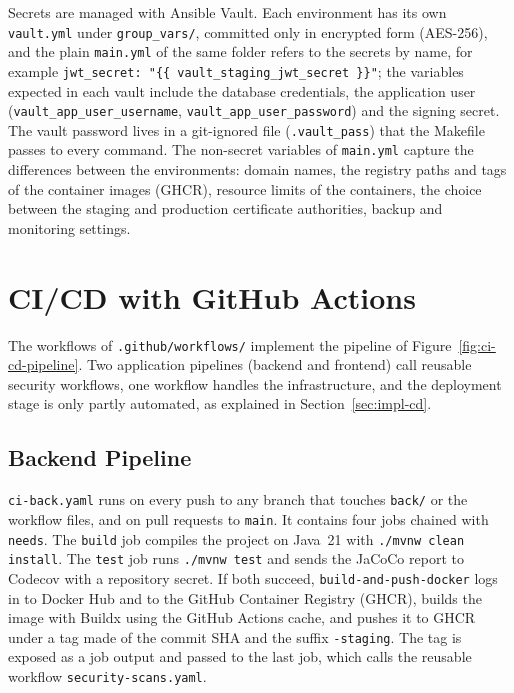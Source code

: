 Secrets are managed with Ansible Vault. Each environment has its own \texttt{vault.yml} under \texttt{group\_vars/}, committed only in encrypted form (AES-256), and the plain \texttt{main.yml} of the same folder refers to the secrets by name, for example \texttt{jwt\_secret: "\{\{ vault\_staging\_jwt\_secret \}\}"}; the variables expected in each vault include the database credentials, the application user (\texttt{vault\_app\_user\_username}, \texttt{vault\_app\_user\_password}) and the signing secret. The vault password lives in a git-ignored file (\texttt{.vault\_pass}) that the Makefile passes to every command. The non-secret variables of \texttt{main.yml} capture the differences between the environments: domain names, the registry paths and tags of the container images (GHCR), resource limits of the containers, the choice between the staging and production certificate authorities, backup and monitoring settings.

\section{CI/CD with GitHub Actions}
\label{sec:impl-cicd}

The workflows of \texttt{.github/workflows/} implement the pipeline of Figure~\ref{fig:ci-cd-pipeline}. Two application pipelines (backend and frontend) call reusable security workflows, one workflow handles the infrastructure, and the deployment stage is only partly automated, as explained in Section~\ref{sec:impl-cd}.



\subsection{Backend Pipeline}

\texttt{ci-back.yaml} runs on every push to any branch that touches \texttt{back/} or the workflow files, and on pull requests to \texttt{main}. It contains four jobs chained with \texttt{needs}. The \texttt{build} job compiles the project on Java~21 with \texttt{./mvnw clean install}. The \texttt{test} job runs \texttt{./mvnw test} and sends the JaCoCo report to Codecov with a repository secret. If both succeed, \texttt{build-and-push-docker} logs in to Docker Hub and to the GitHub Container Registry (GHCR), builds the image with Buildx using the GitHub Actions cache, and pushes it to GHCR under a tag made of the commit SHA and the suffix \texttt{-staging}. The tag is exposed as a job output and passed to the last job, which calls the reusable workflow \texttt{security-scans.yaml}.



